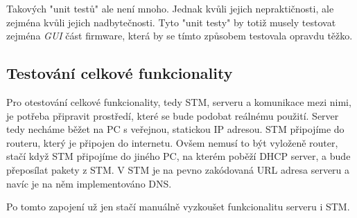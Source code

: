 Takových "unit testů" ale není mnoho.
Jednak kvůli jejich nepraktičnosti, ale zejména kvůli jejich nadbytečnosti.
Tyto "unit testy" by totiž musely testovat zejména \emph{GUI} část firmware, která by se tímto způsobem
testovala opravdu těžko.

\subsection{Testování celkové funkcionality}
Pro otestování celkové funkcionality, tedy STM, serveru a komunikace mezi nimi, je potřeba připravit
prostředí, které se bude podobat reálnému použití.
Server tedy necháme běžet na PC s veřejnou, statickou IP adresou.
STM připojíme do routeru, který je připojen do internetu.
Ovšem nemusí to být vyloženě router, stačí když STM připojíme do jiného PC, na kterém poběží
DHCP server, a bude přeposílat pakety z STM.
V STM je na pevno zakódovaná URL adresa serveru a navíc je na něm implementováno DNS.

Po tomto zapojení už jen stačí manuálně vyzkoušet funkcionalitu serveru i STM.


